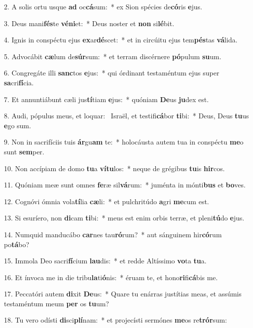 2. A solis ortu usque \textbf{ad} oc\textbf{cá}sum:~*  ex Sion spécies de\textbf{có}ris \textbf{e}jus.\

3. Deus mani\textbf{fés}te \textbf{vé}\textbf{ni}et:~*  Deus noster et \textbf{non} si\textbf{lé}bit.\

4. Ignis in conspéctu ejus \textbf{ex}ar\textbf{dé}scet:~*  et in circúitu ejus tem\textbf{pés}tas \textbf{vá}lida.\

5. Advocábit \textbf{cæ}lum de\textbf{súr}sum:~*  et terram discérnere \textbf{pó}pulum \textbf{su}um.\

6. Congregáte illi \textbf{sanc}tos \textbf{e}jus:~*  qui órdinant testaméntum ejus super \textbf{sa}cri\textbf{fí}cia.\

7. Et annuntiábunt cæli jus\textbf{tí}tiam \textbf{e}jus:~*  quóniam \textbf{De}us \textbf{ju}dex est.\

8. Audi, pópulus meus, et loquar: \dag\  Israël, et testifi\textbf{cá}bor \textbf{ti}bi:~*  Deus, Deus \textbf{tu}us \textbf{e}go sum.\

9. Non in sacrifíciis tuis \textbf{ár}gu\textbf{am} te:~*  holocáusta autem tua in conspéctu \textbf{me}o sunt \textbf{sem}per.\

10. Non accípiam de domo \textbf{tu}a \textbf{ví}\textbf{tu}los:~*  neque de grégibus \textbf{tu}is \textbf{hir}cos.\

11. Quóniam meæ sunt omnes \textbf{fe}ræ sil\textbf{vá}rum:~*  juménta in mónti\textbf{bus} et \textbf{bo}ves.\

12. Cognóvi ómnia vola\textbf{tí}lia \textbf{cæ}li:~*  et pulchritúdo \textbf{a}gri \textbf{me}cum est.\

13. Si esuríero, non \textbf{di}cam \textbf{ti}bi:~*  meus est enim orbis terræ, et pleni\textbf{tú}do \textbf{e}jus.\

14. Numquid manducábo \textbf{car}nes tau\textbf{ró}rum?~*  aut sánguinem hir\textbf{có}rum po\textbf{tá}bo?\

15. Immola Deo sacri\textbf{fí}cium \textbf{lau}dis:~*  et redde Altíssimo \textbf{vo}ta \textbf{tu}a.\

16. Et ínvoca me in die tribu\textbf{la}ti\textbf{ó}nis:~*  éruam te, et hono\textbf{ri}fi\textbf{cá}bis me.\

17. Peccatóri autem \textbf{di}xit \textbf{De}us:~*  Quare tu enárras justítias meas, et assúmis testaméntum meum \textbf{per} os \textbf{tu}um?\

18. Tu vero odísti \textbf{di}sci\textbf{plí}nam:~*  et projecísti sermónes \textbf{me}os re\textbf{trór}sum:\

